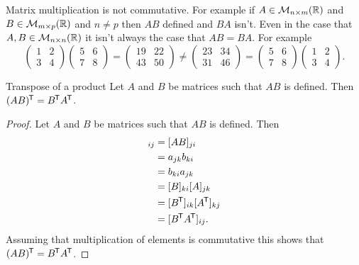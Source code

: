 Matrix multiplication is not commutative.
For example if \(A\in\mathcal{M}_{{n}\times{m}}({\mathbb{R}})\) and \(B\in\mathcal{M}_{{m}\times{p}}({\mathbb{R}})\) and \(n \ne p\) then \(AB\) defined and \(BA\) isn't.
Even in the case that \(A, B \in \mathcal{M}_{{n}\times{n}}({\mathbb{R}})\) it isn't always the case that \(AB = BA\).
For example
\[
\begin{pmatrix}
    1 & 2\\
    3 & 4
\end{pmatrix}
\begin{pmatrix}
    5 & 6\\
    7 & 8
\end{pmatrix}
=
\begin{pmatrix}
    19 & 22\\
    43 & 50
\end{pmatrix}
\ne
\begin{pmatrix}
    23 & 34\\
    31 & 46
\end{pmatrix}
=
\begin{pmatrix}
    5 & 6\\
    7 & 8
\end{pmatrix}
\begin{pmatrix}
    1 & 2\\
    3 & 4
\end{pmatrix}
.
\]
\begin{lemma}{Transpose of a product}{}
    Let \(A\) and \(B\) be matrices such that \(AB\) is defined.
    Then \((AB)^{\mkern-1.5mu\mathsf{T}} = B^{\mkern-1.5mu\mathsf{T}} A^{\mkern-1.5mu\mathsf{T}}\).
\end{lemma}
\begin{proof}
    Let \(A\) and \(B\) be matrices such that \(AB\) is defined.
    Then
    \begin{align*}
        [(AB)\trans]_{ij} &= [AB]_{ji}\\
        &= a_{jk}b_{ki}\\
        &= b_{ki}a_{jk}\\
        &= [B]_{ki}[A]_{jk}\\
        &= [B\trans]_{ik}[A\trans]_{kj}\\
        &= [B\trans A\trans]_{ij}.
    \end{align*}
    Assuming that multiplication of elements is commutative this shows that \((AB)^{\mkern-1.5mu\mathsf{T}} = B^{\mkern-1.5mu\mathsf{T}} A^{\mkern-1.5mu\mathsf{T}}\).
\end{proof}


